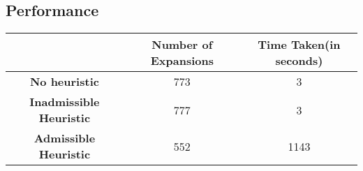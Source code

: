 \documentclass[12pt]{article}
\begin{document}
\subsection{Performance}
\begin{center}
\begin{tabular}{| c | c | c |}
\hline
  & \textbf{Number of Expansions} & \textbf{Time Taken(in seconds)} \\ 
 \hline
 \textbf{No heuristic} & 773 & 3 \\  
 \hline
 \textbf{Inadmissible Heuristic} & 777 & 3 \\   
 \hline
 \textbf{Admissible Heuristic} & 552 & 1143 \\
\hline
\end{tabular}
\end{center}
\end{document}
